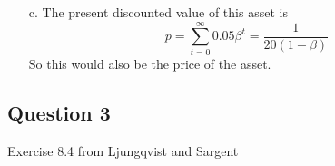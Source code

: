 \documentclass{article}
\begin{document}
\begin{itemize}
	\item[c.] The present discounted value of this asset is $$ p = \sum_{t=0}^\infty 0.05\beta^t = \frac{1}{20(1-\beta)} $$ So this would also be the price of the asset.
	
\end{itemize}



\subsection*{Question 3}
Exercise 8.4 from Ljungqvist and Sargent


\end{document}
